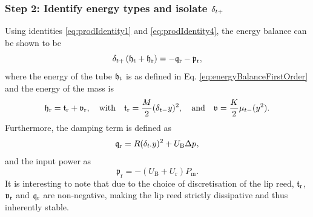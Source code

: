 \subsubsection{Step 2: Identify energy types and isolate $\delta_{t+}$}
Using identities \eqref{eq:prodIdentity1} and \eqref{eq:prodIdentity4}, the energy balance can be shown to be
\begin{equation}\label{eq:powerBalanceLipreed}
    \delta_{t+}\left(\mathfrak{h}_\text{t}+\mathfrak{h}_\text{r}\right) = - \mathfrak{q}_\text{r} - \mathfrak{p}_\text{r},
\end{equation}
where the energy of the tube $\mathfrak{h}_{\text{t}}$ is as defined in Eq. \eqref{eq:energyBalanceFirstOrder} and the energy of the mass is
\begin{equation}
    \mathfrak{h}_{\text{r}} = \mathfrak{t}_{\text{r}} + \mathfrak{v}_{\text{r}}, \quad \text{with} \quad \mathfrak{t}_{\text{r}} = \frac{M}{2}(\delta_{t-}y)^2, \quad \text{and} \quad \mathfrak{v} = \frac{K}{2}\mu_{t-}(y^2).
\end{equation}
Furthermore, the damping term is defined as
\begin{equation}
    \mathfrak{q}_\text{r} = R(\delta_{t\cdot} y)^2 + U_\text{B}\Delta p^{},
\end{equation}
and the input power as
\begin{equation}
    \mathfrak{p}_\text{r} = -(U_\text{B} + U_\text{r})P_\text{m}.
\end{equation}
It is interesting to note that due to the choice of discretisation of the lip reed, $\mathfrak{t}_{\text{r}}$, $\mathfrak{v}_{\text{r}}$ and $\mathfrak{q}_{\text{r}}$ are non-negative, making the lip reed strictly dissipative and thus inherently stable. 

